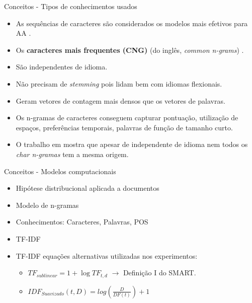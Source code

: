 \begin{frame}{Conceitos - Tipos de conhecimentos usados}\selectFont

	\begin{tcolorbox}[colback=green!1!white,colframe=green!35!black,title=Caracteres,valign=center]
		\begin{itemize}
			\item As sequências de caracteres são considerados os modelos mais efetivos para AA \cite{KjellWF94,Neal2017}.
			\item Os {\bf caracteres mais frequentes (CNG)} (do inglês, {\it common n-grams}) \cite{Keselj2003,Sapkota2014}.
			\item São independentes de idioma.
			\item Não precisam de {\it stemming} pois lidam bem com idiomas flexionais.
			\item Geram vetores de contagem mais densos que os vetores de palavras.
			\item Os n-gramas de caracteres conseguem capturar pontuação, utilização de espaços, preferências temporais, palavras de função de tamanho curto.
			\item O trabalho em  mostra que apesar de independente de idioma nem todos os {\it char n-gramas} tem a mesma origem.
		\end{itemize}

	\end{tcolorbox}
\end{frame}

\begin{frame}{Conceitos - Modelos computacionais}
\begin{tcolorbox}[title=Modelo tradicional de representação textual - BOW,valign=center]\selectFont
	\begin{itemize}
		\item Hipótese distribucional aplicada a documentos \cite{Turney2010}
		\item Modelo de n-gramas
		\item Conhecimentos: Caracteres, Palavras, POS
		\item TF-IDF
		\item TF-IDF equações alternativas utilizadas nos experimentos:
			\begin{itemize}\selectFont
				\item $ TF_{sublinear} = 1 + \log TF_{t,d}$  $\longrightarrow$ Definição I do SMART. 
				\item $
				IDF_{Suavizado}(t,D) = log\left (
				\frac{D}{DF(t)}
				\right ) + 1
				$
			\end{itemize}
	\end{itemize}	
\end{tcolorbox}
\end{frame}


